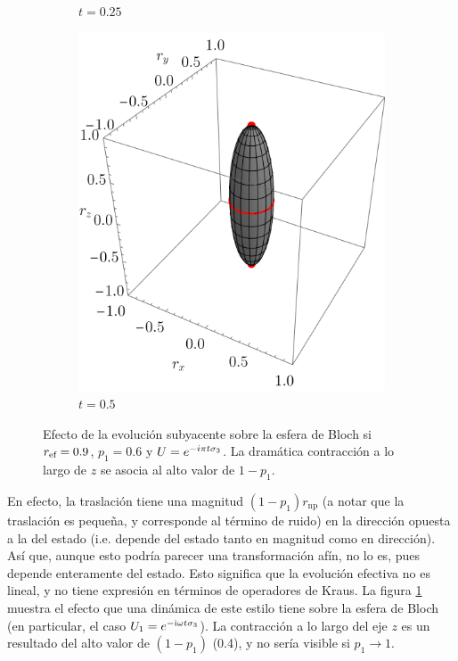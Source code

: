 \begin{figure}[ht!]
\begin{subfigure}{0.32\textwidth}
      \caption{$t=0.25$}
    \end{subfigure}
    \begin{subfigure}{0.32\textwidth}
      \centering
      \includegraphics[width=0.9\linewidth]{chapter3/figures_separable/szxId_t=0.5_p=0.6_r=0.9.png}
      \caption{$t=0.5$}
    \end{subfigure}
    \caption{Efecto de la evolución subyacente sobre la esfera de Bloch si $r_{\text{ef}}=0.9$, $p_{1}=0.6$ y $U=e^{-i\pi t \sigma_{3}}$. La dramática contracción a lo largo de $z$ se asocia al alto valor de $1-p_{1}$.}
    \label{fig:FaseChangeSequence}
\end{figure}

En efecto, la traslación tiene una magnitud $(1-p_{1})r_{\text{np}}$ (a notar que la traslación es pequeña, y corresponde al término de ruido) en la dirección opuesta a la del estado (i.e. depende del estado tanto en magnitud como en dirección). Así que, aunque esto podría parecer una transformación afín, no lo es, pues depende enteramente del estado. Esto significa que la evolución efectiva no es lineal, y no tiene expresión en términos de operadores de Kraus. La figura \ref{fig:FaseChangeSequence} muestra el efecto que una dinámica de este estilo tiene sobre la esfera de Bloch (en particular, el caso $U_{1}=e^{-\text{i}\omega t \sigma_{3}}$). La contracción a lo largo del eje $z$ es un resultado del alto valor de $(1-p_{1})$ (0.4), y no sería visible si $p_{1}\rightarrow 1$.


